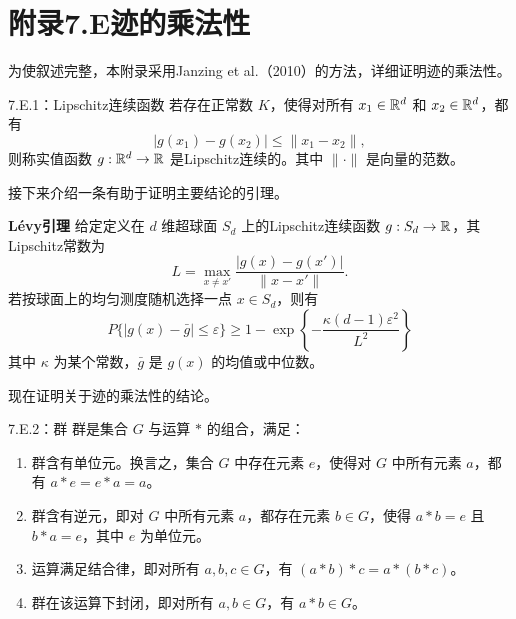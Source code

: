 \section*{附录7.E\quad 迹的乘法性}

为使叙述完整，本附录采用Janzing et al.（2010）的方法，详细证明迹的乘法性。

\begin{bookdefinition}{7.E.1：Lipschitz连续函数}
若存在正常数 $K$，使得对所有 $x_1\in\mathbb{R}^d$ 和 $x_2\in\mathbb{R}^d$，都有
\begin{equation}
|g(x_1)-g(x_2)|\le\|x_1-x_2\|,\tag{7.E.1}
\end{equation}
则称实值函数 $g:\mathbb{R}^d\to\mathbb{R}$ 是Lipschitz连续的。其中 $\|\cdot\|$ 是向量的范数。
\end{bookdefinition}

接下来介绍一条有助于证明主要结论的引理。

\par\medskip\noindent\textbf{Lévy引理}\quad
给定定义在 $d$ 维超球面 $S_d$ 上的Lipschitz连续函数 $g:S_d\to\mathbb{R}$，其Lipschitz常数为
\begin{equation}
L=\max_{x\ne x'}\frac{|g(x)-g(x')|}{\|x-x'\|}.\tag{7.E.2}
\end{equation}
若按球面上的均匀测度随机选择一点 $x\in S_d$，则有
\begin{equation}
P\{|g(x)-\bar g|\le\varepsilon\}
 \ge1-\exp\left\{-\frac{\kappa(d-1)\varepsilon^2}{L^2}\right\}\tag{7.E.3}
\end{equation}
其中 $\kappa$ 为某个常数，$\bar g$ 是 $g(x)$ 的均值或中位数。

现在证明关于迹的乘法性的结论。

\begin{bookdefinition}{7.E.2：群}
群是集合 $G$ 与运算 $*$ 的组合，满足：
\begin{enumerate}
\item 群含有单位元。换言之，集合 $G$ 中存在元素 $e$，使得对 $G$ 中所有元素 $a$，都有 $a*e=e*a=a$。
\item 群含有逆元，即对 $G$ 中所有元素 $a$，都存在元素 $b\in G$，使得 $a*b=e$ 且 $b*a=e$，其中 $e$ 为单位元。
\item 运算满足结合律，即对所有 $a,b,c\in G$，有 $(a*b)*c=a*(b*c)$。
\item 群在该运算下封闭，即对所有 $a,b\in G$，有 $a*b\in G$。
\end{enumerate}
\end{bookdefinition}

